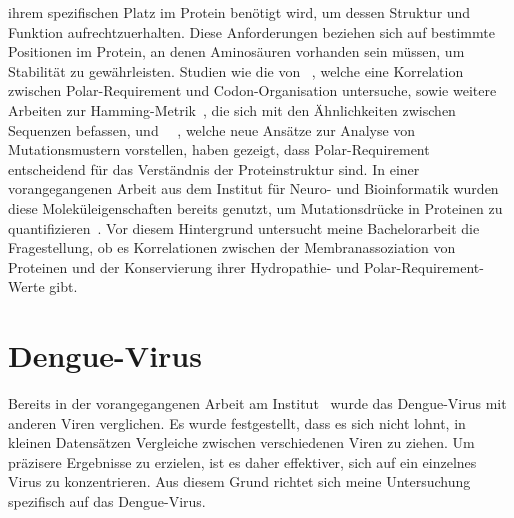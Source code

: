 \documentclass[german,version-2022-01]{uzl-thesis}
\begin{document}
ihrem spezifischen Platz im Protein ben\"otigt wird, um dessen Struktur und Funktion aufrechtzuerhalten. Diese Anforderungen beziehen sich auf bestimmte Positionen im Protein, an denen Aminos\"auren vorhanden sein m\"ussen, um Stabilit\"at zu gew\"ahrleisten. Studien wie die von \citeauthor{mathew_physical_2008}~\cite{mathew_physical_2008}, welche eine Korrelation zwischen Polar-Requirement und Codon-Organisation untersuche, sowie weitere Arbeiten zur Hamming-Metrik~\cite{hammingMetric}, die sich mit den \"Ahnlichkeiten zwischen Sequenzen befassen, und \citeauthor{lenstra2015}~\citeyear{lenstra2015}~\cite{lenstra2015}, welche neue Ans\"atze zur Analyse von Mutationsmustern vorstellen, haben gezeigt, dass Polar-Requirement entscheidend f\"ur das Verst\"andnis der Proteinstruktur sind. In einer vorangegangenen Arbeit aus dem Institut f\"ur Neuro- und Bioinformatik wurden diese Molek\"uleigenschaften bereits genutzt, um Mutationsdr\"ucke in Proteinen zu quantifizieren~\cite{nina}. Vor diesem Hintergrund untersucht meine Bachelorarbeit die Fragestellung, ob es Korrelationen zwischen der Membranassoziation von Proteinen und der Konservierung ihrer Hydropathie- und Polar-Requirement-Werte gibt.

\section{Dengue-Virus}
Bereits in der vorangegangenen Arbeit am Institut~\cite{nina} wurde das Dengue-Virus mit anderen Viren verglichen. Es wurde festgestellt, dass es sich nicht lohnt, in kleinen Datens\"atzen Vergleiche zwischen verschiedenen Viren zu ziehen. Um pr\"azisere Ergebnisse zu erzielen, ist es daher effektiver, sich auf ein einzelnes Virus zu konzentrieren. Aus diesem Grund richtet sich meine Untersuchung spezifisch auf das Dengue-Virus.
\end{document}
